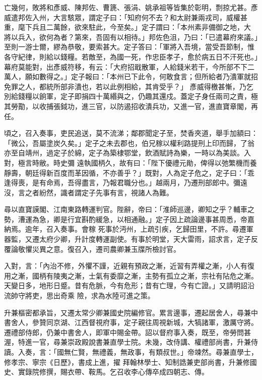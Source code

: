 \begin{pinyinscope}
 亡幾何，敗將和彥威、陳邦佐、曹篪、張涓、姚承祖等皆集於彰明，剽掠尤甚。彥威遣邦佐入州，大言駭眾，謂定子曰：「知府何不去？和太尉兼兩戎司，威權甚重，麾下兵且二萬餘，欲來駐此，今至矣。」定子謂曰：「本州素非備御之地，大
 將以兵入，欲何為者？第來，吾固有以相待。」邦佐色沮，乃曰：「已遣幕府來議。」至則一游士爾，繆為恭敬，要索甚大。定子答曰：「軍將入吾境，當受吾節制，惟各守紀律，則給以錢糧。若敵至，為國一死，作忠臣孝子，愈於病五日不汗死也。」幕府莫能對，出彥威符移，有云：「大府招戢散軍，人給錢米若干，今所部不下二萬人，願如數得之。」定子報曰：「本州已下此令，何敢食言；但所給者乃潰軍就招免罪之人，都統所部非潰也，若以此例相給，其肯受乎？」
 彥威得檄甚慚，乃乞別給錢糧以餉軍，定子即捐四十萬緡與之，仍趣其還戍。蓋定子身任兩司之責，極其勞勩，以收捕張鉞功，進三官，以防遏招收潰兵功，又進一官，進直寶章閣，再任。



 頃之，召入奏事，吏民追送，莫不流涕；鄰郡聞定子至，焚香夾道，舉手加額曰：「微公，吾屬塗炭久矣。」定子之未去郡也，伯兄稼以權利路提刑上印而歸，了翁亦至自靖州，過定子於綿，定子為築棣鄂堂，飲酒賦詩為樂，一時以為美談。入對，極言時敝。時史彌
 遠執國柄久，故有曰：「陛下優禮元勛，俾得以弛繁機而養靜壽，朝廷得新百度而革因循，不亦善乎？」既對，人為定子危之，定子曰：「乖逢得喪，是有命焉，吾得盡言，乃報君職分也。」越兩月，乃遷刑部郎中。彌遠沒，言之者紛然，識者謂定子先事有言，視諸人為難。



 尋以直寶謨閣、江南東路轉運判官。陛辭，帝曰：「淮師巡邊，卿知之乎？輔車之勢，漕運為急，卿是行宜斟酌緩急，以相通融。」定子因上疏論邊事甚周悉，帝嘉納焉。逾年，召入奏事。會稼
 死事於沔州，上疏引疾，乞歸田里，不許。尋遷軍器監，又遷太府少卿，升計度轉運副使。有事於明堂，天大雷雨，詔求言，定子反覆論敬懼災異之意。復召入，遷司農卿兼玉牒所檢討官。



 入對，言：「內治不修，外懼不謹，近親有預政之漸，近習有弄權之漸，小人有復用之漸，國柄有陵夷之漸，士氣有委靡之漸，主勢有孤立之漸，宗社有阽危之漸。天變日多，地形日蹙。昔有危脈，今有危形；昔有亡理，今有亡證。」又請明詔沿流帥守將吏，思出奇乘
 險，求為水陸可進之策。



 升兼樞密都承旨，又遷太常少卿兼國史院編修官。累言邊事，遷起居舍人，尋兼中書舍人，參贊同京湖、江西督視府事，定子親往周視新城，大犒諸軍，激厲守將。遷禮部侍郎，仍兼中書舍人，即軍中賜金帶。詔以督府事入奏，既至，帝勞問甚渥，特進一官，尋兼崇政殿說書兼直學士院。未幾，改侍講、權禮部尚書，升兼侍讀。入奏，言：「國無仁賢，無禮義，無政事，有類叔世。」帝竦然。尋兼直學士，修孝宗、寧宗《日歷》，書成上進，擢
 拜翰林學士、知制誥兼吏部尚書，升兼修國史、實錄院修撰，賜衣帶、鞍馬。乞召收李心傳卒成四朝志、傳。




\end{pinyinscope}
